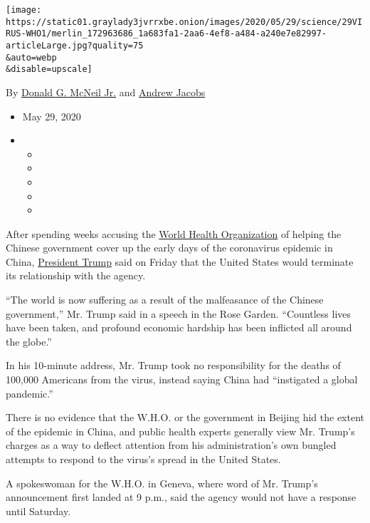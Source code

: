 \texttt{[image: https://static01.graylady3jvrrxbe.onion/images/2020/05/29/science/29VIRUS-WHO1/merlin\_172963686\_1a683fa1-2aa6-4ef8-a484-a240e7e82997-articleLarge.jpg?quality=75\\\&auto=webp\\\&disable=upscale]}

By
\href{https://www.nytimes3xbfgragh.onion/by/donald-g-mcneil-jr}{Donald
G. McNeil Jr.} and
\href{https://www.nytimes3xbfgragh.onion/by/andrew-jacobs}{Andrew
Jacobs}

\begin{itemize}
\item
  May 29, 2020
\item
  \begin{itemize}
  \item
  \item
  \item
  \item
  \item
  \end{itemize}
\end{itemize}

After spending weeks accusing the
\href{https://www.nytimes3xbfgragh.onion/2020/05/29/us/politics/trump-hong-kong-china-WHO.html}{World
Health Organization} of helping the Chinese government cover up the
early days of the coronavirus epidemic in China,
\href{https://www.nytimes3xbfgragh.onion/2020/05/29/us/politics/trump-hong-kong-china-WHO.html}{President
Trump} said on Friday that the United States would terminate its
relationship with the agency.

``The world is now suffering as a result of the malfeasance of the
Chinese government,'' Mr. Trump said in a speech in the Rose Garden.
``Countless lives have been taken, and profound economic hardship has
been inflicted all around the globe.''

In his 10-minute address, Mr. Trump took no responsibility for the
deaths of 100,000 Americans from the virus, instead saying China had
``instigated a global pandemic.''

There is no evidence that the W.H.O. or the government in Beijing hid
the extent of the epidemic in China, and public health experts generally
view Mr. Trump's charges as a way to deflect attention from his
administration's own bungled attempts to respond to the virus's spread
in the United States.

A spokeswoman for the W.H.O. in Geneva, where word of Mr. Trump's
announcement first landed at 9 p.m., said the agency would not have a
response until Saturday.

